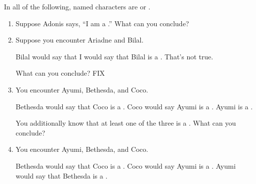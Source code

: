 \probsec{~\ref{sec:knights-knaves}}

  In all of the following, named characters are \knights or \knaves.

\begin{enumerate}
  \item Suppose Adonis says, ``I am a \knight.'' What can you conclude?
  \item Suppose you encounter Ariadne and Bilal.
  \begin{dialogue}
     Bilal would say that I would say that Bilal is a \knight.
     That's not true.
  \end{dialogue}
  What can you conclude? FIX
  \item You encounter Ayumi, Bethesda, and Coco.
  \begin{dialogue}
     Bethesda would say that Coco is a \knave.
     Coco would say Ayumi is a \knave.
     Ayumi is a \knight.
  \end{dialogue} 
  You additionally know that at least one of the three is a \knave. What can you conclude?

  \item You encounter Ayumi, Bethesda, and Coco.
  \begin{dialogue}
     Bethesda would say that Coco is a \knave.
     Coco would say Ayumi is a \knave.
     Ayumi would say that Bethesda is a \knave.
  \end{dialogue} 
\end{enumerate}

